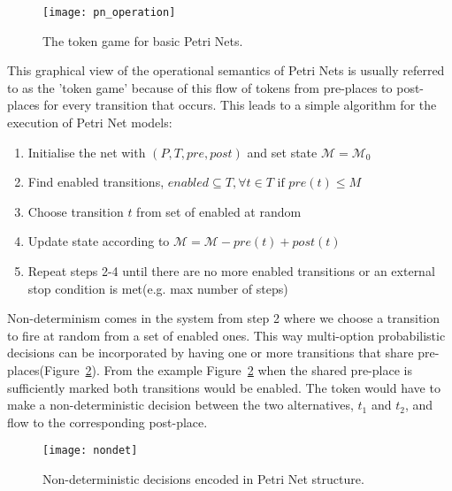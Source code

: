 \begin{figure}
\centering
\texttt{[image: pn\_operation]}
\caption{The token game for basic Petri Nets.}
\label{fig:pn_operation}
\end{figure}

This graphical view of the operational semantics of Petri Nets is
usually referred to as the 'token game' because of this flow of tokens
from pre-places to post-places for every transition that occurs. This
leads to a simple algorithm for the execution of Petri Net models:

\begin{enumerate}[noitemsep]
\item Initialise the net  with $(P, T, pre, post)$ and set state $\mathcal{M} = \mathcal{M}_0$
\item Find enabled transitions, $enabled \subseteq T, \forall t \in T \mbox{ if } pre(t) \leq M$
\item Choose transition $t$ from set of enabled at random
\item Update state according to $\mathcal{M} = \mathcal{M} -pre(t) + post(t)$
\item Repeat steps 2-4 until there are no more enabled transitions or an external stop condition is met(e.g. max number of steps)
\end{enumerate}
Non-determinism comes in the system from step 2 where we choose a
transition to fire at random from a set of enabled ones. This way multi-option
probabilistic decisions can be incorporated by having one or more
transitions that share pre-places(Figure~\ref{fig:nondet}). From the
example Figure~\ref{fig:nondet} when the shared pre-place is
sufficiently marked both transitions would be enabled. The token would
have to make a non-deterministic decision between the two
alternatives, $t_1$ and $t_2$, and flow to the corresponding
post-place.

\begin{figure}
\centering
\texttt{[image: nondet]}
\caption{Non-deterministic decisions encoded in Petri Net structure.}
\label{fig:nondet}
\end{figure}

